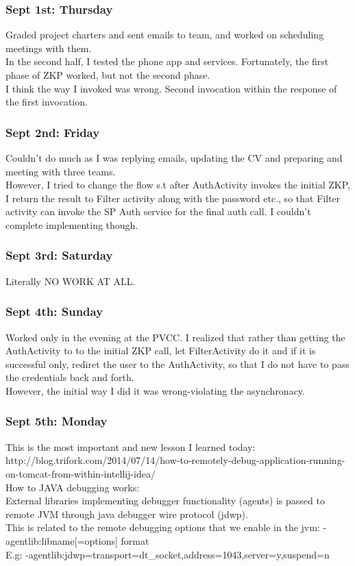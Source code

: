 \documentclass[11pt]{article}
\begin{document}
\subsubsection*{Sept 1st: Thursday}
Graded project charters and sent emails to team, and worked on scheduling meetings with them.\\
In the second half, I tested the phone app and services. Fortunately, the first phase of ZKP worked, but not the second phase.\\
I think the way I invoked was wrong. Second invocation within the response of the first invocation.

\subsubsection*{Sept 2nd: Friday}
Couldn't do much as I was replying emails, updating the CV and preparing and meeting with three teams.\\
However, I tried to change the flow s.t after AuthActivity invokes the initial ZKP, I return the result to Filter activity along with the password 
etc., so that Filter activity can invoke the SP Auth service for the final auth call. I couldn't complete implementing though.

\subsubsection*{Sept 3rd: Saturday}
Literally NO WORK AT ALL.

\subsubsection*{Sept 4th: Sunday}
Worked only in the evening at the PVCC.
I realized that rather than getting the AuthActivity to to the initial ZKP call, let FilterActivity do it and if it is successful only, rediret the 
user to the AuthActivity, so that I do not have to pass the credentials back and forth.\\
However, the initial way I did it was wrong-violating the asynchronacy.\\

\subsubsection*{Sept 5th: Monday}
This is the most important and new lesson I learned today: 
http://blog.trifork.com/2014/07/14/how-to-remotely-debug-application-running-on-tomcat-from-within-intellij-idea/\\
How to JAVA debugging works:\\
External libraries implementing debugger functionality (agents) is passed to remote JVM through java debugger wire protocol (jdwp).\\
This is related to the remote debugging options that we enable in the jvm: -agentlib:libname[=options] format\\
E.g: -agentlib:jdwp=transport=dt\_socket,address=1043,server=y,suspend=n\\
\end{document}
